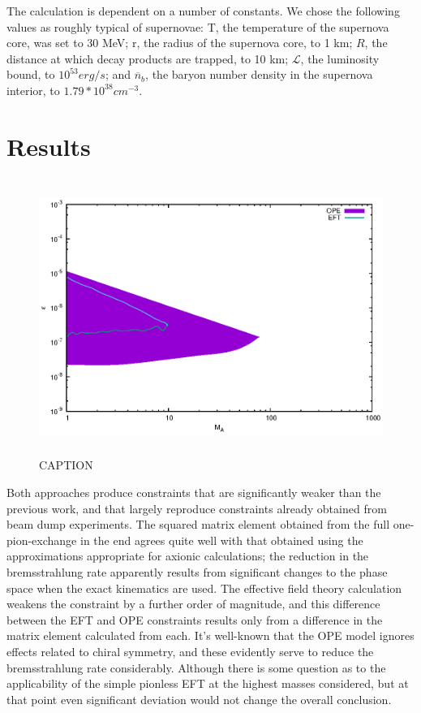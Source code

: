 \documentclass[nofootinbib,aps,prd,preprint,superscriptaddress]{revtex4}
\newcommand{\n}{\overline{n}}
\begin{document}
The calculation is dependent on a number of constants. We chose the following values as roughly typical of supernovae: T, the temperature of the supernova core, was set to 30 MeV; r, the radius of the supernova core, to 1 km; $ R $, the distance at which decay products are trapped, to 10 km; $ \mathcal{L} $, the luminosity bound, to $ 10^{53} erg/s $; and $ \n_b $, the baryon number density in the supernova interior, to $ 1.79*10^{38} cm^{-3} $. 

\section{Results}

\begin{figure}[h!]
\includegraphics[height=9cm]{ope_bound.eps}
\caption{CAPTION}
\end{figure}

Both approaches produce constraints that are significantly weaker than the previous work, and that largely reproduce constraints already obtained from beam dump experiments. The squared matrix element obtained from the full one-pion-exchange in the end agrees quite well with that obtained using the approximations appropriate for axionic calculations; the reduction in the bremsstrahlung rate apparently results from significant changes to the phase space when the exact kinematics are used. The effective field theory calculation weakens the constraint by a further order of magnitude, and this difference between the EFT and OPE constraints results only from a difference in the matrix element calculated from each. It's well-known that the OPE model ignores effects related to chiral symmetry, and these evidently serve to reduce the bremsstrahlung rate considerably. Although there is some question as to the applicability of the simple pionless EFT at the highest masses considered, but at that point even significant deviation would not change the overall conclusion.
\end{document}
